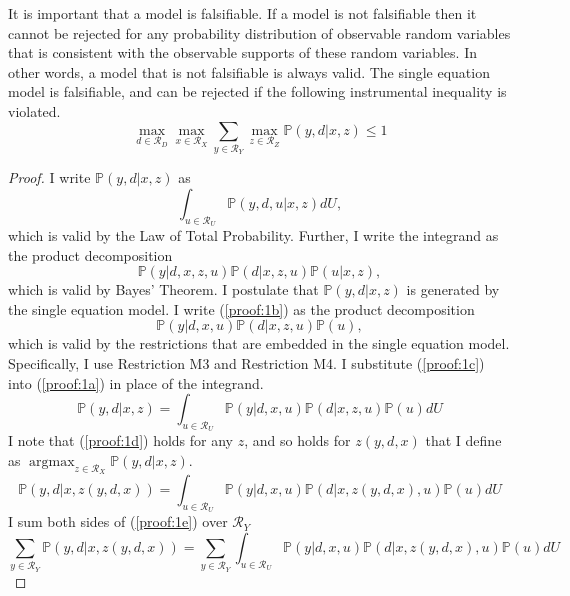 \documentclass[12pt,a4paper,twoside]{article}
\DeclareMathOperator*{\argmax}{argmax}
\numberwithin{equation}{section}
\begin{document}
It is important that a model is falsifiable. If a model is not falsifiable then it cannot be rejected for any probability distribution of observable random variables that is consistent with the observable supports of these random variables. In other words, a model that is not falsifiable is always valid. The single equation model is falsifiable, and can be rejected if the following instrumental inequality is violated.
\begin{equation}
\max_{d\in\mathcal{R}_D}\max_{x\in\mathcal{R}_X}\sum_{y\in\mathcal{R}_Y}\max_{z\in\mathcal{R}_Z}\mathbb{P}(y,d|x,z)\leq 1\label{eq:false}
\end{equation}
\vspace{20pt} 
\begin{proof}
I write $\mathbb{P}(y,d|x,z)$ as 
\begin{equation}
\int_{u\in\mathcal{R}_U}\mathbb{P}(y,d,u|x,z)dU,\label{proof:1a}
\end{equation}
which is valid by the Law of Total Probability. Further, I write the integrand as the product decomposition 
\begin{equation}
\mathbb{P}(y|d,x,z,u)\mathbb{P}(d|x,z,u)\mathbb{P}(u|x,z),\label{proof:1b}
\end{equation}
which is valid by Bayes' Theorem. I postulate that $\mathbb{P}(y,d|x,z)$ is generated by the single equation model. I write (\ref{proof:1b}) as the product decomposition
\begin{equation}
\mathbb{P}(y|d,x,u)\mathbb{P}(d|x,z,u)\mathbb{P}(u),\label{proof:1c}
\end{equation}
which is valid by the restrictions that are embedded in the single equation model. Specifically, I use Restriction M3 and Restriction M4. I substitute (\ref{proof:1c}) into (\ref{proof:1a}) in place of the integrand. 
\begin{equation}
\mathbb{P}(y,d|x,z)=\int_{u\in\mathcal{R}_U}\mathbb{P}(y|d,x,u)\mathbb{P}(d|x,z,u)\mathbb{P}(u)dU\label{proof:1d}
\end{equation}
I note that (\ref{proof:1d}) holds for any $z$, and so holds for $z(y,d,x)$ that I define as $\argmax_{z\in\mathcal{R}_X}\mathbb{P}(y,d|x,z)$. 
\begin{equation}
\mathbb{P}(y,d|x,z(y,d,x))=\int_{u\in\mathcal{R}_U}\mathbb{P}(y|d,x,u)\mathbb{P}(d|x,z(y,d,x),u)\mathbb{P}(u)dU\label{proof:1e}
\end{equation}
I sum both sides of (\ref{proof:1e}) over $\mathcal{R}_Y$
\begin{equation}
\sum_{y\in\mathcal{R}_Y}\mathbb{P}(y,d|x,z(y,d,x))=\sum_{y\in\mathcal{R}_Y}\int_{u\in\mathcal{R}_U}\mathbb{P}(y|d,x,u)\mathbb{P}(d|x,z(y,d,x),u)\mathbb{P}(u)dU\nonumber

\end{equation}
\end{proof}
\end{document}
